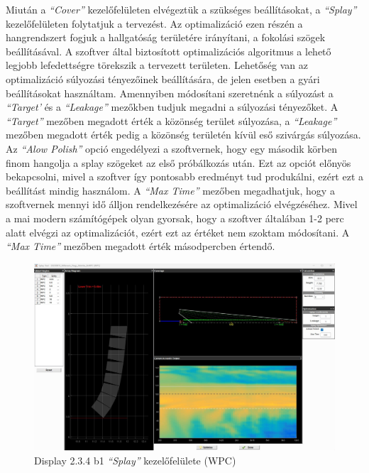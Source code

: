Miután a \textit{``Cover''} kezelőfelületen elvégeztük a szükséges beállításokat, a \textit{``Splay''} kezelőfelületen folytatjuk a tervezést.
Az optimalizáció ezen részén a hangrendszert fogjuk a hallgatóság területére irányítani, a fokolási szögek beállításával.
A szoftver által biztosított optimalizációs algoritmus a lehető legjobb lefedettségre törekszik a tervezett területen.
Lehetőség van az optimalizáció súlyozási tényezőinek beállítására, de jelen esetben a gyári beállításokat használtam.
Amennyiben módosítani szeretnénk a súlyozást a \textit{``Target'} és a \textit{``Leakage''} mezőkben tudjuk megadni a súlyozási tényezőket.
A \textit{``Target''} mezőben megadott érték a közönség terület súlyozása,
a \textit{``Leakage''} mezőben megadott érték pedig a közönség területén kívül eső szivárgás súlyozása.
Az \textit{``Alow Polish''} opció engedélyezi a szoftvernek, hogy egy második körben finom hangolja a splay szögeket az első próbálkozás után.
Ezt az opciót előnyös bekapcsolni, mivel a szoftver így pontosabb eredményt tud produkálni, ezért ezt a beállítást mindig használom.
A \textit{``Max Time''} mezőben megadhatjuk, hogy a szoftvernek mennyi idő álljon rendelkezésére az optimalizáció elvégzéséhez.
Mivel a mai modern számítógépek olyan gyorsak, hogy a szoftver általában 1-2 perc alatt elvégzi az optimalizációt, ezért ezt az értéket
nem szoktam módosítani. A \textit{``Max Time''} mezőben megadott érték másodpercben értendő.
\begin{figure}[H]
	\centering
	\includegraphics[width=\textwidth, keepaspectratio]{figures/display_wpc_3.jpg}
	\caption{Display 2.3.4 b1 \textit{``Splay''} kezelőfelülete (WPC)}\label{fig:display_wpc_3}
\end{figure}

